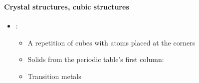 \begin{frame}
\frametitle{\texorpdfstring{\culine[\sectiontitleulinecolor]{\sectiontitle}}{\sectiontitle} }
\framesubtitle{Crystal structures, cubic structures}


\vspace{1mm}
\begin{minipage}{10.5cm}
\begin{itemize}%
\item {}:
\begin{itemize}
	\item A repetition of cubes with atoms placed at the corners 
	
	\item Solids from the periodic table's first column: 
	\item Transition metals
	\end{itemize}


\end{itemize}
\end{minipage}
\end{frame}
